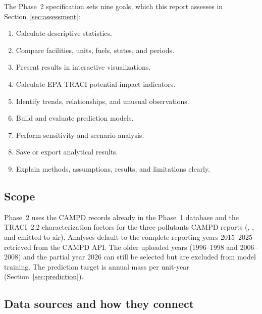 \documentclass[11pt,a4paper]{article}
\begin{document}
The Phase~2 specification sets nine goals, which this report assesses in
Section~\ref{sec:assessment}:
\begin{enumerate}[label=G\arabic*., itemsep=0pt]
  \item Calculate descriptive statistics.
  \item Compare facilities, units, fuels, states, and periods.
  \item Present results in interactive visualizations.
  \item Calculate EPA TRACI potential-impact indicators.
  \item Identify trends, relationships, and unusual observations.
  \item Build and evaluate prediction models.
  \item Perform sensitivity and scenario analysis.
  \item Save or export analytical results.
  \item Explain methods, assumptions, results, and limitations clearly.
\end{enumerate}

\subsection{Scope}

Phase~2 uses the CAMPD records already in the Phase~1 database and the TRACI~2.2
characterization factors for the three pollutants CAMPD reports (\COtwo{}, \SOtwo{}, and \NOx{}
emitted to air). Analyses default to the complete reporting years 2015--2025 retrieved from the
CAMPD API. The older uploaded years (1996--1998 and 2006--2008) and the partial year 2026 can
still be selected but are excluded from model training. The prediction target is annual \NOx{}
mass per unit-year (Section~\ref{sec:prediction}).

\subsection{Data sources and how they connect}
\label{sec:data}
\end{document}
